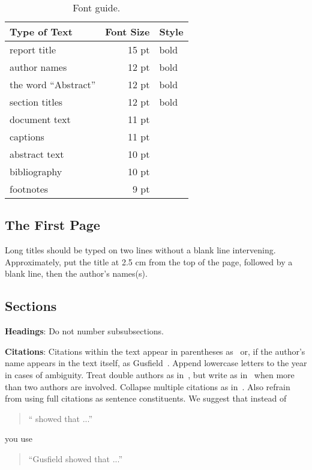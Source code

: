 \documentclass[11pt]{article}
\begin{document}
\begin{table}[h]
\begin{center}
\begin{tabular}{|l|rl|}
\hline \bf Type of Text & \bf Font Size & \bf Style \\ \hline
report title & 15 pt & bold \\
author names & 12 pt & bold \\
the word ``Abstract'' & 12 pt & bold \\
section titles & 12 pt & bold \\
document text & 11 pt  &\\
captions & 11 pt & \\
abstract text & 10 pt & \\
bibliography & 10 pt & \\
footnotes & 9 pt & \\
\hline
\end{tabular}
\end{center}
\caption{\label{font-table} Font guide.}
\end{table}

\subsection{The First Page}
\label{ssec:first}
Long titles should be typed on two lines
without a blank line intervening. Approximately, put the title at 2.5
cm from the top of the page, followed by a blank line, then the
author's names(s).

\subsection{Sections}

{\bf Headings}: Do not number subsubsections.

{\bf Citations}: Citations within the text appear in parentheses
as~\cite{Gusfield:97} or, if the author's name appears in the text
itself, as Gusfield~.  Append lowercase letters
to the year in cases of ambiguity.  Treat double authors as
in~\cite{Aho:72}, but write as in~\cite{Chandra:81} when more than two
authors are involved. Collapse multiple citations as
in~\cite{Gusfield:97,Aho:72}. Also refrain from using full citations
as sentence constituents. We suggest that instead of
\begin{quote}
  ``\cite{Gusfield:97} showed that ...''
\end{quote}
you use
\begin{quote}
``Gusfield    showed that ...''
\end{quote}
\end{document}
